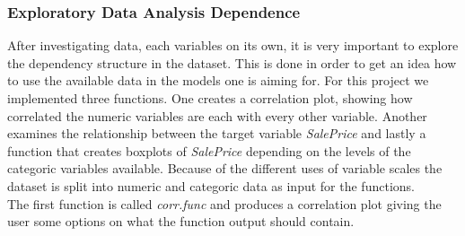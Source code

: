\subsubsection{Exploratory Data Analysis Dependence}
After investigating data, each variables on its own, it is very important to explore the dependency structure in the dataset. This is done in order to get an idea how to use the available data in the models one is aiming for. For this project we implemented three functions. One creates a correlation plot, showing how correlated the numeric variables are each with every other variable. Another examines the relationship between the target variable \textit{SalePrice} and lastly a function that creates boxplots of \textit{SalePrice} depending on the levels of the categoric variables available. Because of the different uses of variable scales the dataset is split into numeric and categoric data as input for the functions. \\
The first function is called \textit{corr.func} and produces a correlation  plot giving the user some options on what the function output should contain.
